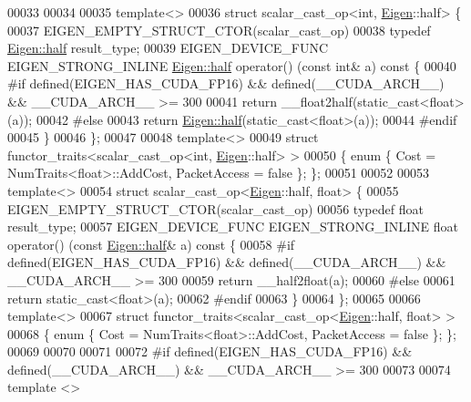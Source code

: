 \begin{DoxyCode}
00033 
00034 
00035 \textcolor{keyword}{template}<>
00036 \textcolor{keyword}{struct }scalar\_cast\_op<int, \hyperlink{namespace_eigen}{Eigen}::half> \{
00037   EIGEN\_EMPTY\_STRUCT\_CTOR(scalar\_cast\_op)
00038   \textcolor{keyword}{typedef} \hyperlink{struct_eigen_1_1half}{Eigen::half} result\_type;
00039   EIGEN\_DEVICE\_FUNC EIGEN\_STRONG\_INLINE \hyperlink{struct_eigen_1_1half}{Eigen::half} operator() (\textcolor{keyword}{const} \textcolor{keywordtype}{int}& a)\textcolor{keyword}{ const }\{
00040 \textcolor{preprocessor}{    #if defined(EIGEN\_HAS\_CUDA\_FP16) && defined(\_\_CUDA\_ARCH\_\_) && \_\_CUDA\_ARCH\_\_ >= 300}
00041       \textcolor{keywordflow}{return} \_\_float2half(static\_cast<float>(a));
00042 \textcolor{preprocessor}{    #else}
00043       \textcolor{keywordflow}{return} \hyperlink{struct_eigen_1_1half}{Eigen::half}(static\_cast<float>(a));
00044 \textcolor{preprocessor}{    #endif}
00045   \}
00046 \};
00047 
00048 \textcolor{keyword}{template}<>
00049 \textcolor{keyword}{struct }functor\_traits<scalar\_cast\_op<int, \hyperlink{namespace_eigen}{Eigen}::half> >
00050 \{ \textcolor{keyword}{enum} \{ Cost = NumTraits<float>::AddCost, PacketAccess = \textcolor{keyword}{false} \}; \};
00051 
00052 
00053 \textcolor{keyword}{template}<>
00054 \textcolor{keyword}{struct }scalar\_cast\_op<\hyperlink{namespace_eigen}{Eigen}::half, float> \{
00055   EIGEN\_EMPTY\_STRUCT\_CTOR(scalar\_cast\_op)
00056   \textcolor{keyword}{typedef} \textcolor{keywordtype}{float} result\_type;
00057   EIGEN\_DEVICE\_FUNC EIGEN\_STRONG\_INLINE \textcolor{keywordtype}{float} operator() (\textcolor{keyword}{const} \hyperlink{struct_eigen_1_1half}{Eigen::half}& a)\textcolor{keyword}{ const }\{
00058 \textcolor{preprocessor}{    #if defined(EIGEN\_HAS\_CUDA\_FP16) && defined(\_\_CUDA\_ARCH\_\_) && \_\_CUDA\_ARCH\_\_ >= 300}
00059       \textcolor{keywordflow}{return} \_\_half2float(a);
00060 \textcolor{preprocessor}{    #else}
00061       \textcolor{keywordflow}{return} \textcolor{keyword}{static\_cast<}\textcolor{keywordtype}{float}\textcolor{keyword}{>}(a);
00062 \textcolor{preprocessor}{    #endif}
00063   \}
00064 \};
00065 
00066 \textcolor{keyword}{template}<>
00067 \textcolor{keyword}{struct }functor\_traits<scalar\_cast\_op<\hyperlink{namespace_eigen}{Eigen}::half, float> >
00068 \{ \textcolor{keyword}{enum} \{ Cost = NumTraits<float>::AddCost, PacketAccess = \textcolor{keyword}{false} \}; \};
00069 
00070 
00071 
00072 \textcolor{preprocessor}{#if defined(EIGEN\_HAS\_CUDA\_FP16) && defined(\_\_CUDA\_ARCH\_\_) && \_\_CUDA\_ARCH\_\_ >= 300}
00073 
00074 \textcolor{keyword}{template} <>

\end{DoxyCode}
